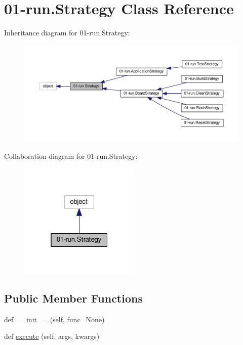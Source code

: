 \hypertarget{class01-run_1_1Strategy}{}\section{01-\/run.Strategy Class Reference}
\label{class01-run_1_1Strategy}


Inheritance diagram for 01-\/run.Strategy\+:
\nopagebreak
\begin{figure}[H]
\begin{center}
\leavevmode
\includegraphics[width=350pt]{class01-run_1_1Strategy__inherit__graph}
\end{center}
\end{figure}


Collaboration diagram for 01-\/run.Strategy\+:
\nopagebreak
\begin{figure}[H]
\begin{center}
\leavevmode
\includegraphics[width=163pt]{class01-run_1_1Strategy__coll__graph}
\end{center}
\end{figure}
\subsection*{Public Member Functions}
\begin{DoxyCompactItemize}
\item 
def \hyperlink{class01-run_1_1Strategy_aa2524f763ebf13d960888c4c00628a23}{\+\_\+\+\_\+init\+\_\+\+\_\+} (self, func=None)
\item 
def \hyperlink{class01-run_1_1Strategy_a0d7ab0f31a0f5a29a7f307f9bdfbfd40}{execute} (self, args, kwargs)
\end{DoxyCompactItemize}


